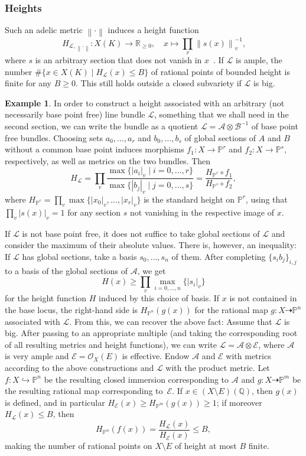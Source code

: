 \documentclass[a4paper, twoside, 10pt]{amsart}
\newcommand{\cA}{\mathcal{A}}
\newcommand{\cB}{\mathcal{B}}
\newcommand{\cE}{\mathcal{E}}
\newcommand{\cL}{\mathcal{L}}
\newcommand{\cO}{\mathcal{O}}
\newcommand{\PP}{\mathbb{P}}
\newcommand{\RR}{\mathbb{R}}
\newcommand{\QQ}{\mathbb{Q}}
\newcommand{\abs}[1]{\left\lvert#1\right\rvert}
\newcommand{\norm}[1]{\left\lVert#1\right\rVert}
\theoremstyle{definition}
\newtheorem{example}[theorem]{Example}
\begin{document}
\subsubsection{Heights}
Such an adelic metric $\norm{\cdot}$  induces a height function
\[
  H_{\cL,\norm{\cdot}}\colon X(K)\to \RR_{\geq 0},
  \quad x\mapsto \prod_v \norm{s(x)}^{-1}_v\text{,}
\]
where $s$ is an arbitrary section that does not vanish in $x$~\cite[Déf~2.3]{MR2019019}.
If $\cL$ is ample, the number $\#\{x\in X(K)\mid H_\cL(x)\leq B\}$ of rational points of bounded height is finite for any $B\ge 0$. This still holds outside a closed subvariety if $\cL$ is big.

\begin{example}
In order to construct a height associated with an arbitrary (not necessarily base point free) line bundle $\cL$, something that we shall need in the second section, we can write the bundle as a quotient $\cL= \cA\otimes \cB^{-1}$ of base point free bundles.
Choosing sets $a_0,\dots,a_r$ and $b_0,\dots,b_s$ of global sections of $A$ and $B$ without a common base point induces morphisms
$f_1\colon X\to \PP^r$ and $f_2\colon X\to \PP^s$, respectively, as well as metrics on the two bundles.
Then
\[
  H_\cL=\prod_v \frac{\max\{\abs{a_i}_v\mid i=0,\dots,r\}}{\max\{\abs{b_j}_v\mid j=0,\dots,s\}} = \frac{H_{\PP^r}\circ f_1}{H_{\PP^s}\circ f_2},
\]
where $H_{\PP^r} = \prod_v \max\{\abs{x_0}_v,\dots,\abs{x_r}_v\}$ is the standard height on $\PP^r$, using that $\prod_v\abs{s(x)}_v=1$ for any section $s$ not vanishing in the respective image of $x$.

If $\cL$ is not base point free, it does not suffice to take global sections of $\cL$ and consider the maximum of their absolute values. There is, however, an inequality: If $\cL$ has global sections, take a basis $s_0,\dots,s_n$ of them. After completing $\{s_i b_j\}_{i,j}$ to a basis of the global sections of $\cA$, we get
\[
  H(x)\ge \prod_v \max_{i=0,\dots,n}\{\abs{s_i}_v\}
\]
for the height function $H$ induced by this choice of basis. If $x$ is not contained in the base locus, the right-hand side is $H_{\PP^n}(g(x))$ for the rational map $g\colon X\dashrightarrow \PP^n$ associated with $\cL$.
From this, we can recover the above fact: Assume that $\cL$ is big. 
After passing to an appropriate multiple (and taking the corresponding root of all resulting metrics and height functions), we can write $\cL=\cA\otimes \cE$, where $\cA$ is very ample and $\cE=\cO_X(E)$ is effective.
Endow $\cA$ and $\cE$ with metrics according to the above constructions and $\cL$ with the product metric. Let $f\colon X \hookrightarrow \PP^n$ be the resulting closed immersion corresponding to $\cA$ and $g\colon X\dashrightarrow \PP^m$ be the resulting rational map corresponding to~$\cE$. If $x\in (X\setminus E)(\QQ)$, then $g(x)$ is defined, and in particular $H_\cE(x) \ge H_{\PP^m}(g(x))\ge 1$; if moreover $H_\cL(x)\le B$, then
\[
  H_{\PP^n}(f(x)) = \frac{H_\cL(x)}{H_\cE (x)} \le B,
\]
making the number of rational points on $X\setminus E$ of height at most $B$ finite.
\end{example}
\end{document}

